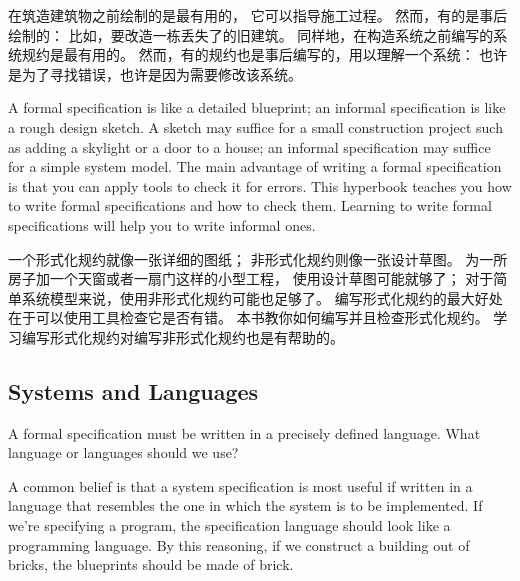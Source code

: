 \begin{ch}
  在筑造建筑物之前绘制的\blueprint{}是最有用的，
  它可以指导施工过程。
  然而，有的\blueprint{}是事后绘制的：
  比如，要改造一栋丢失了\blueprint{}的旧建筑。
  同样地，在构造系统之前编写的系统规约是最有用的。
  然而，有的规约也是事后编写的，用以理解一个系统：
  也许是为了寻找错误，也许是因为需要修改该系统。
\end{ch}

\begin{en}
A formal specification is like a detailed blueprint; an informal
specification is like a rough design sketch.  A sketch may suffice for
a small construction project such as adding a skylight or a door to a
house; an informal specification may suffice for a simple system model.
The main advantage of writing a formal specification is that you can
apply tools to check it for errors.  This hyperbook teaches you how to
write formal specifications and how to check them.  Learning to write
formal specifications will help you to write informal ones.
\end{en}

\begin{ch}
  一个形式化规约就像一张详细的图纸；
  非形式化规约则像一张设计草图。
  为一所房子加一个天窗或者一扇门这样的小型工程，
  使用设计草图可能就够了；
  对于简单系统模型来说，使用非形式化规约可能也足够了。
  编写形式化规约的最大好处在于可以使用工具检查它是否有错。
  本书教你如何编写并且检查形式化规约。
  学习编写形式化规约对编写非形式化规约也是有帮助的。
\end{ch}


\subsection{Systems and Languages}

A formal specification must be written in a precisely defined
language.  What language or languages should we use?

A common belief is that a system specification is most useful if 
written in a language that resembles the one in which the system is to
be implemented.  If we're specifying a program, the specification
language should look like a programming language.  By this reasoning,
if we construct a building out of bricks, the blueprints should be
made of brick.

